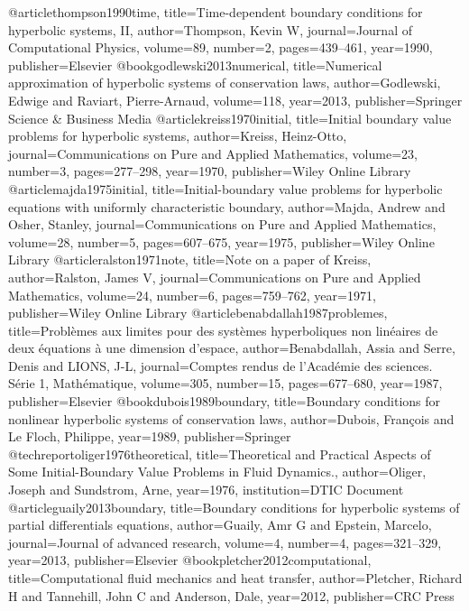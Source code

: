 @article{thompson1990time,
  title={Time-dependent boundary conditions for hyperbolic systems, II},
  author={Thompson, Kevin W},
  journal={Journal of Computational Physics},
  volume={89},
  number={2},
  pages={439--461},
  year={1990},
  publisher={Elsevier}
}
@book{godlewski2013numerical,
  title={Numerical approximation of hyperbolic systems of conservation laws},
  author={Godlewski, Edwige and Raviart, Pierre-Arnaud},
  volume={118},
  year={2013},
  publisher={Springer Science \& Business Media}
}
@article{kreiss1970initial,
  title={Initial boundary value problems for hyperbolic systems},
  author={Kreiss, Heinz-Otto},
  journal={Communications on Pure and Applied Mathematics},
  volume={23},
  number={3},
  pages={277--298},
  year={1970},
  publisher={Wiley Online Library}
}
@article{majda1975initial,
  title={Initial-boundary value problems for hyperbolic equations with uniformly characteristic boundary},
  author={Majda, Andrew and Osher, Stanley},
  journal={Communications on Pure and Applied Mathematics},
  volume={28},
  number={5},
  pages={607--675},
  year={1975},
  publisher={Wiley Online Library}
}
@article{ralston1971note,
  title={Note on a paper of Kreiss},
  author={Ralston, James V},
  journal={Communications on Pure and Applied Mathematics},
  volume={24},
  number={6},
  pages={759--762},
  year={1971},
  publisher={Wiley Online Library}
}
@article{benabdallah1987problemes,
  title={Probl{\`e}mes aux limites pour des syst{\`e}mes hyperboliques non lin{\'e}aires de deux {\'e}quations {\`a} une dimension d'espace},
  author={Benabdallah, Assia and Serre, Denis and LIONS, J-L},
  journal={Comptes rendus de l'Acad{\'e}mie des sciences. S{\'e}rie 1, Math{\'e}matique},
  volume={305},
  number={15},
  pages={677--680},
  year={1987},
  publisher={Elsevier}
}
@book{dubois1989boundary,
  title={Boundary conditions for nonlinear hyperbolic systems of conservation laws},
  author={Dubois, Fran{\c{c}}ois and Le Floch, Philippe},
  year={1989},
  publisher={Springer}
}
@techreport{oliger1976theoretical,
  title={Theoretical and Practical Aspects of Some Initial-Boundary Value Problems in Fluid Dynamics.},
  author={Oliger, Joseph and Sundstrom, Arne},
  year={1976},
  institution={DTIC Document}
}
@article{guaily2013boundary,
  title={Boundary conditions for hyperbolic systems of partial differentials equations},
  author={Guaily, Amr G and Epstein, Marcelo},
  journal={Journal of advanced research},
  volume={4},
  number={4},
  pages={321--329},
  year={2013},
  publisher={Elsevier}
}
@book{pletcher2012computational,
  title={Computational fluid mechanics and heat transfer},
  author={Pletcher, Richard H and Tannehill, John C and Anderson, Dale},
  year={2012},
  publisher={CRC Press}
}

